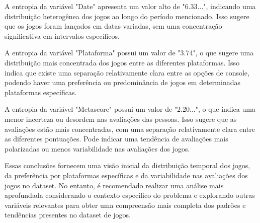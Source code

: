 \documentclass[a4paper,12pt]{article}
\begin{document}
A entropia da variável "Date" apresenta um valor alto de "6.33...", indicando uma distribuição heterogênea dos jogos ao longo do período mencionado. Isso sugere que os jogos foram lançados em datas variadas, sem uma concentração significativa em intervalos específicos.

A entropia da variável "Plataforma" possui um valor de "3.74", o que sugere uma distribuição mais concentrada dos jogos entre as diferentes plataformas. Isso indica que existe uma separação relativamente clara entre as opções de console, podendo haver uma preferência ou predominância de jogos em determinadas plataformas específicas.

A entropia da variável "Metascore" possui um valor de "2.20...", o que indica uma menor incerteza ou desordem nas avaliações das pessoas. Isso sugere que as avaliações estão mais concentradas, com uma separação relativamente clara entre as diferentes pontuações. Pode indicar uma tendência de avaliações mais polarizadas ou menos variabilidade nas avaliações dos jogos.

Essas conclusões fornecem uma visão inicial da distribuição temporal dos jogos, da preferência por plataformas específicas e da variabilidade nas avaliações dos jogos no dataset. No entanto, é recomendado realizar uma análise mais aprofundada considerando o contexto específico do problema e explorando outras variáveis relevantes para obter uma compreensão mais completa dos padrões e tendências presentes no dataset de jogos.
\end{document}
